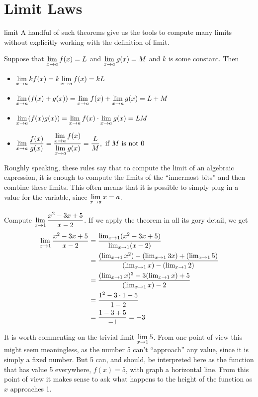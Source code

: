 \section{Limit Laws}

limit
A handful of such theorems give us the tools to compute many limits
without explicitly working with the definition of limit.

\begin{mainTheorem} Suppose that $\displaystyle \lim_{x\to a}f(x)=L$ and $\displaystyle \lim_{x\to a}g(x)=M$ and
$k$ is some constant. Then
\begin{itemize}
\item $\displaystyle\lim_{x\to a} kf(x) = k\lim_{x\to a}f(x)=kL$ 
\item $\displaystyle\lim_{x\to a} (f(x)+g(x)) = \lim_{x\to a}f(x)+\lim_{x\to a}g(x)=L+M$  
\item $\displaystyle\lim_{x\to a} (f(x)g(x)) = \lim_{x\to a}f(x)\cdot\lim_{x\to a}g(x)=LM$ 
\item $\displaystyle\lim_{x\to a} \frac{f(x)}{g(x)} = \frac{\displaystyle\lim_{x\to a}f(x)}{\displaystyle\lim_{x\to
    a}g(x)}=\frac{L}{M},\text{ if $M$ is not 0}$
\end{itemize}
\label{thm:limit laws}
\end{mainTheorem}

Roughly speaking, these rules say that to compute the limit of an
algebraic expression, it is enough to compute the limits of the
``innermost bits'' and then combine these limits. This often means
that it is possible to simply plug in a value for the variable, since
$\displaystyle \lim_{x\to a} x =a$.


\begin{example}
Compute $\displaystyle
\lim_{x\to 1}{x^2-3x+5\over x-2}$. If we apply the theorem
in all its gory detail, we get
\begin{align*}
\lim_{x\to 1}{x^2-3x+5\over x-2}&=
{\lim_{x\to 1}(x^2-3x+5)\over \lim_{x\to1}(x-2)} \\
&={(\lim_{x\to 1}x^2)-(\lim_{x\to1}3x)+(\lim_{x\to1}5)\over 
  (\lim_{x\to1}x)-(\lim_{x\to1}2)} \\
&={(\lim_{x\to 1}x)^2-3(\lim_{x\to1}x)+5\over (\lim_{x\to1}x)-2} \\
&={1^2-3\cdot1+5\over 1-2} \\
&={1-3+5\over -1} = -3 \\
\end{align*}
\end{example}

It is worth commenting on the trivial limit $\displaystyle \lim_{x\to1}5$. From one
point of view this might seem meaningless, as the number 5 can't
``approach'' any value, since it is simply a fixed number. But 5 can,
and should, be interpreted here as the function that has value 5
everywhere, $f(x)=5$, with graph a horizontal line. From this point of
view it makes sense to ask what happens to the height of the function
as $x$ approaches 1.

